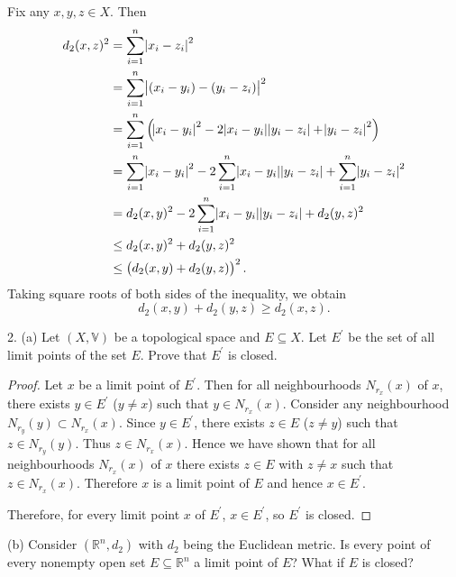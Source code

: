 \documentclass{article}
\newcommand{\R}{\mathbb{R}}
\newcommand{\V}{\mathbb{V}}
\begin{document}
Fix any $x, y, z \in X$. Then
%
\begin{align*}
    d_2(x, z)^2
        &= \sum_{i = 1}^n \envert{x_i - z_i}^2 \\
        &= \sum_{i = 1}^n \envert{(x_i - y_i) - (y_i - z_i)}^2 \\
        &= \sum_{i = 1}^n
            \del{
                \envert{x_i - y_i}^2
                - 2 \envert{x_i - y_i} \envert{y_i - z_i}
                + \envert{y_i - z_i}^2
            } \\
        &= \sum_{i = 1}^n \envert{x_i - y_i}^2
           - 2 \sum_{i = 1}^n \envert{x_i - y_i} \envert{y_i - z_i}
           + \sum_{i = 1}^n \envert{y_i - z_i}^2 \\
        &= d_2(x, y)^2
           - 2 \sum_{i = 1}^n \envert{x_i - y_i} \envert{y_i - z_i}
           + d_2(y, z)^2 \\
        &\leq d_2(x, y)^2 + d_2(y, z)^2 \\
        &\leq \del{d_2(x, y) + d_2(y, z)}^2
    .
\end{align*}
%
Taking square roots of both sides of the inequality, we obtain
%
\begin{equation*}
    d_2(x, y) + d_2(y, z) \geq d_2(x, z)
    .
\end{equation*}

\newpage

2. (a) Let $(X, \V)$ be a topological space and $E \subseteq X$. Let
   $E^\prime$ be the set of all limit points of the set $E$. Prove that
   $E^\prime$ is closed.

\begin{proof}

Let $x$ be a limit point of $E^\prime$. Then for all neighbourhoods
$N_{r_x}(x)$ of $x$, there exists $y \in E^\prime$ ($y \neq x$) such
that $y \in N_{r_x}(x)$. Consider any neighbourhood $N_{r_y}(y) \subset
N_{r_x}(x)$. Since $y \in E^\prime$, there exists $z \in E$ ($z \neq y$)
such that $z \in N_{r_y}(y)$. Thus $z \in N_{r_x}(x)$. Hence we have
shown that for all neighbourhoods $N_{r_x}(x)$ of $x$ there exists $z
\in E$ with $z \neq x$ such that $z \in N_{r_x}(x)$. Therefore $x$ is a
limit point of $E$ and hence $x \in E^\prime$.

Therefore, for every limit point $x$ of $E^\prime$, $x \in E^\prime$, so
$E^\prime$ is closed.

\end{proof}

(b) Consider $(\R^n, d_2)$ with $d_2$ being the Euclidean metric. Is
every point of every nonempty open set $E \subseteq \R^n$ a limit point
of $E$? What if $E$ is closed?
\end{document}
